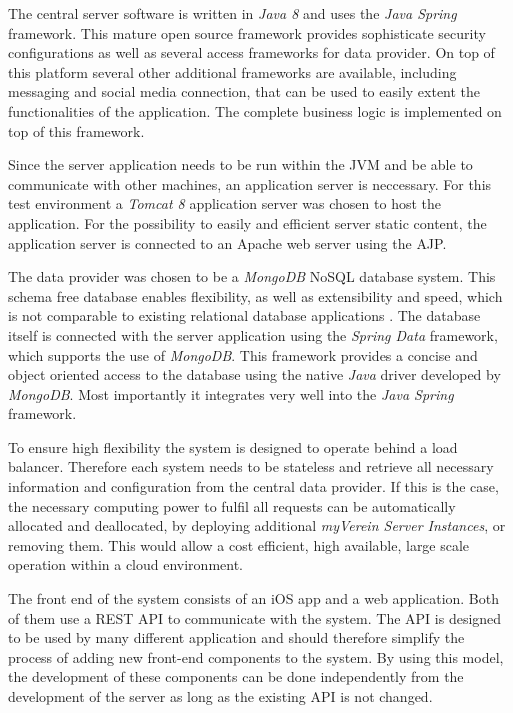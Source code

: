 The central server software is written in \emph{Java 8} and uses the \emph{Java Spring} framework. This mature open source framework provides sophisticate security configurations as well as several access frameworks for data provider. On top of this platform several other additional frameworks are available, including messaging and social media connection, that can be used to easily extent the functionalities of the application. The complete business logic is implemented on top of this framework.

Since the server application needs to be run within the \gls{JVM} and be able to communicate with other machines, an application server is neccessary. For this test environment a \emph{Tomcat 8} application server was chosen to host the application. For the possibility to easily and efficient server static content, the application server is connected to an Apache web server using the \gls{AJP}. 

The data provider was chosen to be a \emph{MongoDB} \gls{NoSQL} database system. This schema free database enables flexibility, as well as extensibility and speed, which is not comparable to existing relational database applications \cite{Moschetti:2014aa}. The database itself is connected with the server application using the \emph{Spring Data} framework, which supports the use of \emph{MongoDB}. This framework provides a concise and object oriented access to the database using the native \emph{Java} driver developed by \emph{MongoDB}. Most importantly it integrates very well into the \emph{Java Spring} framework.

To ensure high flexibility the system is designed to operate behind a load balancer. Therefore each system needs to be stateless and retrieve all necessary information and configuration from the central data provider. If this is the case, the necessary computing power to fulfil all requests can be automatically allocated and deallocated, by deploying additional \emph{myVerein Server Instances}, or removing them. This would allow a cost efficient, high available, large scale operation within a cloud environment.  

The front end of the system consists of an iOS app and a web application. Both of them use a \gls{REST} \gls{API} to communicate with the system. The \gls{API} is designed to be used by many different application and should therefore simplify the process of adding new front-end components to the system. By using this model, the development of these components can be done independently from the development of the server as long as the existing \gls{API} is not changed.

